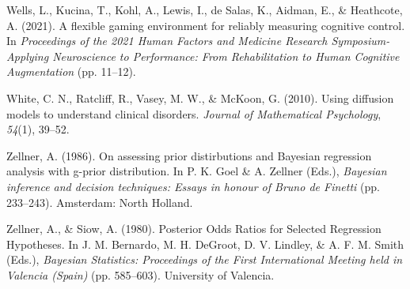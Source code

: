 \documentclass[
  ,man]{apa6}
\newlength{\cslhangindent}
\newlength{\cslentryspacingunit} %
\newenvironment{CSLReferences}[2] %
 {%
  \setlength{\parindent}{0pt}
  \ifodd #1
  \let\oldpar\par
  \def\par{\hangindent=\cslhangindent\oldpar}
  \fi
  \setlength{\parskip}{#2\cslentryspacingunit}
 }%
 {}
\begin{document}
\begin{CSLReferences}{1}{0}
\leavevmode{}%
Wells, L., Kucina, T., Kohl, A., Lewis, I., de Salas, K., Aidman, E., \& Heathcote, A. (2021). A flexible gaming environment for reliably measuring cognitive control. In \emph{Proceedings of the 2021 {Human Factors} and {Medicine Research Symposium-Applying Neuroscience} to {Performance}: {From Rehabilitation} to {Human Cognitive Augmentation}} (pp. 11--12).

\leavevmode{}%
White, C. N., Ratcliff, R., Vasey, M. W., \& McKoon, G. (2010). Using diffusion models to understand clinical disorders. \emph{Journal of Mathematical Psychology}, \emph{54}(1), 39--52.

\leavevmode{}%
Zellner, A. (1986). On assessing prior distirbutions and {Bayesian} regression analysis with g-prior distribution. In P. K. Goel \& A. Zellner (Eds.), \emph{Bayesian inference and decision techniques: {Essays} in honour of {Bruno} de {Finetti}} (pp. 233--243). {Amsterdam}: {North Holland}.

\leavevmode{}%
Zellner, A., \& Siow, A. (1980). Posterior {Odds Ratios} for {Selected Regression Hypotheses}. In J. M. Bernardo, M. H. DeGroot, D. V. Lindley, \& A. F. M. Smith (Eds.), \emph{Bayesian {Statistics}: {Proceedings} of the {First International Meeting} held in {Valencia} ({Spain})} (pp. 585--603). {University of Valencia}.

\end{CSLReferences}
\end{document}
